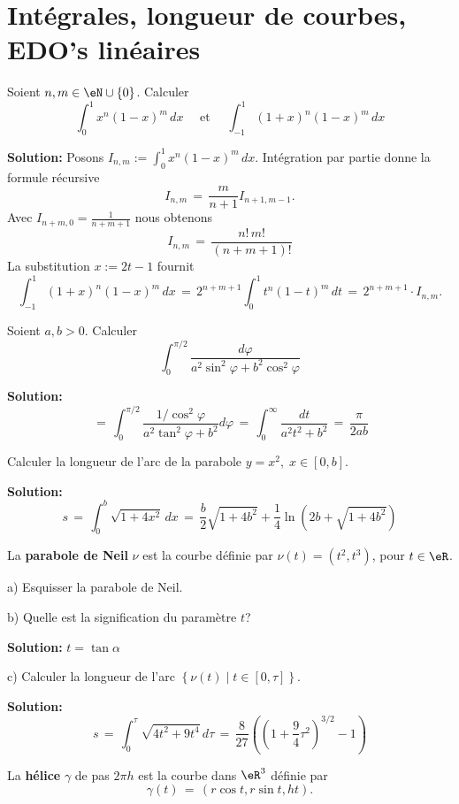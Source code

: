 \section{Intégrales, longueur de courbes, EDO's linéaires}


\exerNico
Soient $n,m \in \eN \cup \{0\}$.
Calculer
$$
	\int_0^1 x^n (1-x)^m \,dx
	\quad \text{ et } \quad
	\int_{-1}^1 (1+x)^n (1-x)^m \,dx
$$

{\bf Solution:}
Posons $I_{n,m} := \int_0^1 x^n (1-x)^m \,dx$.
Intégration par partie donne
la formule récursive
$$
	I_{n,m} \,=\, \frac {m}{n+1} I_{n+1,m-1}.
$$
Avec $I_{n+m,0} = \frac{1}{n+m+1}$ nous obtenons
$$
	I_{n,m} \,=\, \frac{n!\,m!}{(n+m+1)!}
$$
La substitution $x := 2t-1$ fournit
$$
	\int_{-1}^1 (1+x)^n (1-x)^m \,dx
	\,=\, 2^{n+m+1} \int_0^1 t^n (1-t)^m \,dt \,=\,  2^{n+m+1}
	\cdot I_{n,m}.
$$




\exerNico
Soient $a,b >0$.
Calculer
$$
	\int_0^{\pi /2} \displaystyle \frac{d \varphi}{a^2 \sin^2 \varphi + b^2 \cos^2 \varphi}
$$

{\bf Solution:}
$$
	\,=\, \int_0^{\pi /2} \frac{1 / \cos^2 \varphi}{a^2 \tan^2 \varphi+b^2} d\varphi \,=\, \int_0^\infty \frac {dt}{a^2t^2 + b^2} \,=\, \frac{\pi}{2ab}
$$


\exerNico
Calculer la longueur de l'arc de la parabole $y = x^2,\;x \in [0,b]$.

\medskip
{\bf Solution:}
$$
	s \,=\, \int_0^b \sqrt{1+4x^2} \,dx \,=\, \frac b 2 \sqrt{1+4b^2}+ \frac 14 \ln \left(2b+ \sqrt{1+4b^2} \right)
$$


\exerNico
La {\bf parabole de Neil} $\nu$ est la courbe définie par $\nu (t) = (t^2,t^3)$, pour  $t \in \eR$.

\medskip
a)
Esquisser la parabole de Neil.

\medskip
b)
Quelle est la signification du paramètre $t$?

\medskip
{\bf Solution:} $t = \tan \alpha$

\medskip
c)
Calculer la longueur de l'arc
$\left\{ \nu (t) \mid t \in [0,\tau] \right\}$.


\medskip
{\bf Solution:}
$$
	s \,=\, \int_0^\tau \sqrt{4 t^2+9t^4} \,d\tau \,=\, \frac{8}{27} \left( \left(1+ \frac 94 \tau^2\right)^{3/2}-1 \right)
$$



\exerNico
La {\bf hélice} $\gamma$ de pas $2 \pi h$ est la courbe dans $\eR^3$ définie par
$$
	\gamma(t) \,=\, \left( r \cos t , r \sin t , h t \right)  .
$$


